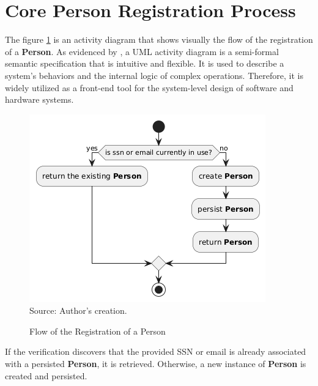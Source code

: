 \section{Core Person Registration Process}
\label{core_person_registration_process}

The figure \ref{fig:person_registration_flow} is an activity diagram that shows visually the flow of the registration of a \textbf{Person}. As evidenced by \cite{alfedaghi2021validationconceptualversusactivity}, a UML activity diagram is a semi-formal semantic specification that is intuitive and flexible. It is used to describe a system's behaviors and the internal logic of complex operations. Therefore, it is widely utilized as a front-end tool for the system-level design of software and hardware systems. 

\begin{figure}[H]
    \centering
    \caption{Flow of the Registration of a Person}
    \includegraphics[width=1\linewidth]
    {figures/person_registration_activity_diagram.png}
    \label{fig:person_registration_flow}
    \footnotesize Source: Author's creation.
\end{figure}

If the verification discovers that the provided SSN or email is already associated with a persisted \textbf{Person}, it is retrieved. Otherwise, a new instance of \textbf{Person} is created and persisted.